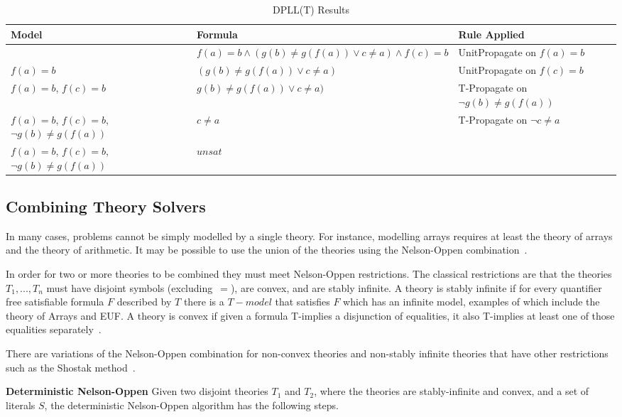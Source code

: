 \documentclass[]{final_report}
\begin{document}
\begin{table}[t]
\centering
\begin{tabular}{|p{4.5cm}|p{6.5cm}|p{3cm}|}
\hline
Model & Formula & Rule Applied \\ \hline
{} & $f(a) = b \land (g(b) \neq g(f(a)) \lor c \neq a) \land f(c) = b$ & UnitPropagate on $f(a) = b$   \\ \hline
{$f(a) = b$ } & $(g(b) \neq g(f(a)) \lor c \neq a)$ & UnitPropagate on $ f(c) = b$   \\ \hline
{$f(a) = b$, $f(c) = b$ } & $g(b) \neq g(f(a)) \lor c \neq a)$ & T-Propagate on $\lnot{g(b) \neq g(f(a))}$   \\ \hline
{$f(a) = b$, $f(c) = b$, $\lnot{g(b) \neq g(f(a))}$ } & $c \neq a$ & T-Propagate on $\lnot{c \neq a}$   \\ \hline
{$f(a) = b$, $f(c) = b$, $\lnot{g(b) \neq g(f(a))}$ } & $unsat$ &    \\ \hline
\end{tabular}
\caption{DPLL(T) Results}
\label{table:dpll-t-results}
\end{table}

\subsection{Combining Theory Solvers}
In many cases, problems cannot be simply modelled by a single theory. For instance, modelling arrays requires at least the theory of arrays and the theory of arithmetic. It may be possible to use the union of the theories using the Nelson-Oppen combination~\cite{smtdpplt}. 

In order for two or more theories to be combined they must meet Nelson-Oppen restrictions. The classical restrictions are that the theories $T_1, ..., T_n$ must have disjoint symbols (excluding~$=$), are convex, and are stably infinite. A theory is stably infinite if for every quantifier free satisfiable formula $F$ described by $T$ there is a $T-model$ that satisfies $F$ which has an infinite model, examples of which include the theory of Arrays and EUF. A theory is convex if given a formula T-implies a disjunction of equalities, it also T-implies at least one of those equalities separately~\cite{Torlak}.

There are variations of the Nelson-Oppen combination for non-convex theories and non-stably infinite theories that have other restrictions such as the Shostak method~\cite{manna2003combining}.

\textbf{Deterministic Nelson-Oppen}
Given two disjoint theories $T_1$ and $T_2$, where the theories are stably-infinite and convex, and a set of literals $S$, the deterministic Nelson-Oppen algorithm has the following steps.
\end{document}
